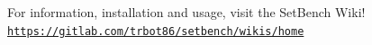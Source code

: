 For information, installation and usage, visit the Set\+Bench Wiki! \href{https://gitlab.com/trbot86/setbench/wikis/home}{\tt https\+://gitlab.\+com/trbot86/setbench/wikis/home} 